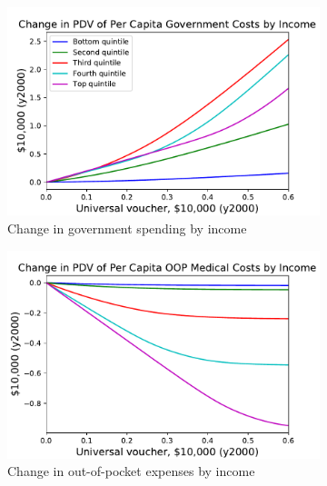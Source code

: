 \documentclass[12pt,pdftex,letterpaper]{article}
\begin{document}
\begin{figure}[h!]
\begin{subfigure}[b]{0.49\textwidth}
    \end{subfigure}
    \begin{subfigure}[b]{0.49\textwidth}
        \centering
        \includegraphics[width=\textwidth]{../Figures/UniversalSubGovtChangeByInc.pdf}
        \caption{Change in government spending by income}
    \end{subfigure}
    \begin{subfigure}[b]{0.49\textwidth}
        \centering
        \includegraphics[width=\textwidth]{../Figures/UniversalSubOOPchangeByInc.pdf}
        \caption{Change in out-of-pocket expenses by income}
    \end{subfigure}
    \begin{subfigure}[b]{0.49\textwidth}
        \centering

\end{subfigure}
\end{figure}
\end{document}
